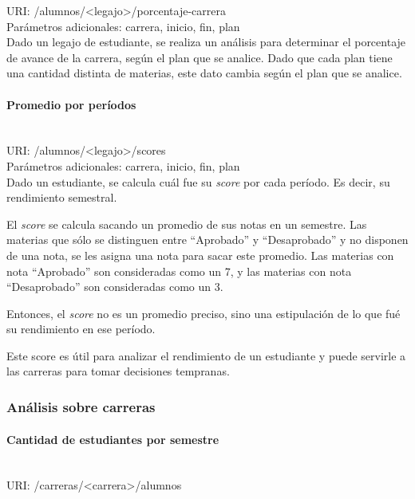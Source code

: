 URI: /alumnos/<legajo>/porcentaje-carrera \\

Parámetros adicionales: carrera, inicio, fin, plan \\

Dado un legajo de estudiante, se realiza un análisis para determinar el porcentaje de avance de la carrera, según el plan que se analice. Dado que cada plan tiene una cantidad distinta de materias, este dato cambia según el plan que se analice.

\paragraph{Promedio por períodos}\mbox{}\\

URI: /alumnos/<legajo>/scores \\

Parámetros adicionales: carrera, inicio, fin, plan \\

Dado un estudiante, se calcula cuál fue su \textit{score} por cada período. Es decir, su rendimiento semestral. 

El \textit{score} se calcula sacando un promedio de sus notas en un semestre. Las materias que sólo se distinguen entre “Aprobado” y “Desaprobado” y no disponen de una nota, se les asigna una nota para sacar este promedio.
Las materias con nota “Aprobado” son consideradas como un 7, y las materias con nota “Desaprobado” son consideradas como un 3.

Entonces, el \textit{score} no es un promedio preciso, sino una estipulación de lo que fué su rendimiento en ese período.

Este score es útil para analizar el rendimiento de un estudiante y puede servirle a las carreras para tomar decisiones tempranas.

\subsubsection{Análisis sobre carreras}

\paragraph{Cantidad de estudiantes por semestre}\mbox{}\\

URI: /carreras/<carrera>/alumnos \\


